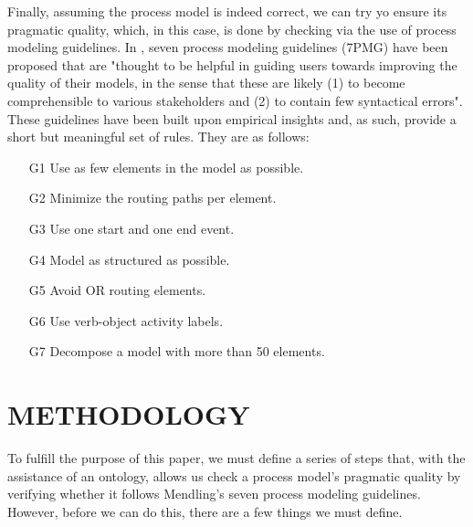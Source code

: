 \documentclass[a4paper,twoside]{article}
\begin{document}




Finally, assuming the process model is indeed correct, we can try yo ensure its pragmatic quality, which, in this case, is done by checking via the use of process modeling guidelines.  In \cite{Mendling2010}, seven process modeling guidelines (7PMG) have been proposed that are "thought to be helpful in guiding users towards improving the quality of their models, in the sense that these are likely (1) to become comprehensible to various stakeholders and (2) to contain few syntactical errors". These guidelines have been built upon empirical insights and, as such, provide a short but meaningful set of rules. They are as follows:
\begin{enumerate}
	\item[G1] Use as few elements in the model as possible.
	\item[G2] Minimize the routing paths per element.
	\item[G3] Use one start and one end event.
	\item[G4] Model as structured as possible. 
	\item[G5] Avoid OR routing elements.
	\item[G6] Use verb-object activity labels.
	\item[G7] Decompose a model with more than 50 elements.
\end{enumerate}

\section{METHODOLOGY}\label{Methodology}


\noindent To fulfill the purpose of this paper, we must define a series of steps that, with the assistance of an ontology, allows us check a process model's pragmatic quality by verifying whether it follows Mendling's seven process modeling guidelines. However, before we can do this, there are a few things we must define. 
\end{document}
